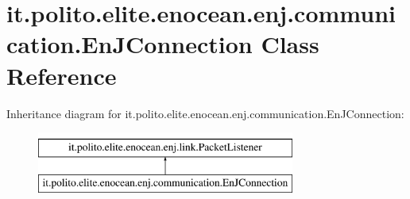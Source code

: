 \hypertarget{classit_1_1polito_1_1elite_1_1enocean_1_1enj_1_1communication_1_1_en_j_connection}{}\section{it.\+polito.\+elite.\+enocean.\+enj.\+communication.\+En\+J\+Connection Class Reference}
\label{classit_1_1polito_1_1elite_1_1enocean_1_1enj_1_1communication_1_1_en_j_connection}
Inheritance diagram for it.\+polito.\+elite.\+enocean.\+enj.\+communication.\+En\+J\+Connection\+:\begin{figure}[H]
\begin{center}
\leavevmode
\includegraphics[height=2.000000cm]{classit_1_1polito_1_1elite_1_1enocean_1_1enj_1_1communication_1_1_en_j_connection}
\end{center}
\end{figure}
